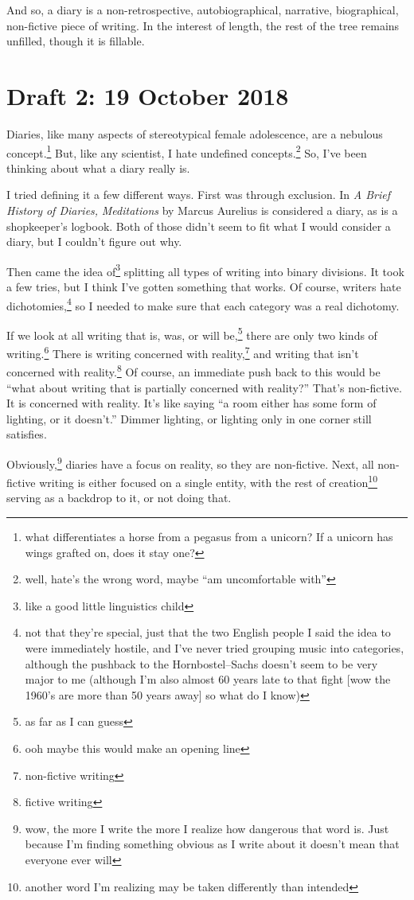 \documentclass[12pt]{article}[titlepage]
\newcommand{\say}[1]{``#1''}
\newcommand{\1}{\={a}}
\newcommand{\2}{\={e}}
\newcommand{\3}{\={\i}}
\newcommand{\4}{\=o}
\newcommand{\5}{\=u}
\newcommand{\6}{\={A}}
\renewcommand{\,}{\textsuperscript{,}}
\begin{document}
And so, a diary is a non-retrospective, autobiographical, narrative, biographical, non-fictive piece of writing.
In the interest of length, the rest of the tree remains unfilled, though it is fillable.

\section{Draft 2: 19 October 2018}
Diaries, like many aspects of stereotypical female adolescence, are a nebulous concept.\footnote{what differentiates a horse from a pegasus from a unicorn? If a unicorn has wings grafted on, does it stay one?}
But, like any scientist, I hate undefined concepts.\footnote{well, hate's the wrong word, maybe \say{am uncomfortable with}}
So, I've been thinking about what a diary really is.

I tried defining it a few different ways.
First was through exclusion.
In \textit{A Brief History of Diaries,} \textit{Meditations} by Marcus Aurelius is considered a diary, as is a shopkeeper's logbook.
Both of those didn't seem to fit what I would consider a diary, but I couldn't figure out why.

Then came the idea of\footnote{like a good little linguistics child} splitting all types of writing into binary divisions.
It took a few tries, but I think I've gotten something that works.
Of course, writers hate dichotomies,\footnote{not that they're special, just that the two English people I said the idea to were immediately hostile, and I've never tried grouping music into categories, although the pushback to the Hornbostel--Sachs doesn't seem to be very major to me (although I'm also almost 60 years late to that fight [wow the 1960's are more than 50 years away] so what do I know)} so I needed to make sure that each category was a real dichotomy.

If we look at all writing that is, was, or will be,\footnote{as far as I can guess} there are only two kinds of writing.\footnote{ooh maybe this would make an opening line}
There is writing concerned with reality,\footnote{non-fictive writing} and writing that isn't concerned with reality.\footnote{fictive writing}
Of course, an immediate push back to this would be \say{what about writing that is partially concerned with reality?}
That's non-fictive.
It is concerned with reality.
It's like saying \say{a room either has some form of lighting, or it doesn't.}
Dimmer lighting, or lighting only in one corner still satisfies.

Obviously,\footnote{wow, the more I write the more I realize how dangerous that word is. Just because I'm finding something obvious as I write about it doesn't mean that everyone ever will} diaries have a focus on reality, so they are non-fictive.
Next, all non-fictive writing is either focused on a single entity, with the rest of creation\footnote{another word I'm realizing may be taken differently than intended} serving as a backdrop to it, or not doing that.
\end{document}

